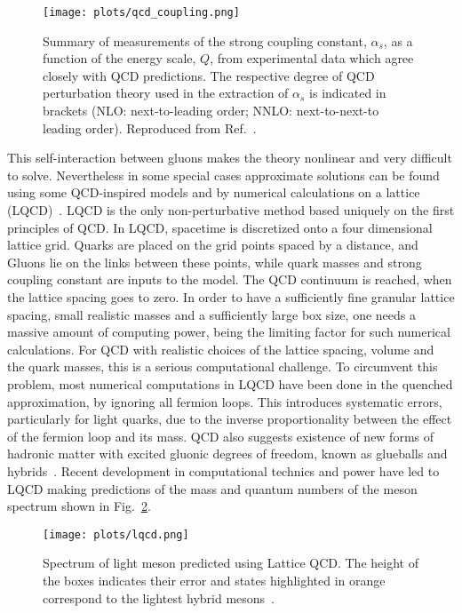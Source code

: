 \begin{figure}[!t]
    \centering
        \texttt{[image: plots/qcd\_coupling.png]}
        \caption{Summary of measurements of the strong coupling constant, $\alpha_{s}$, as a function of the energy scale, $Q$, from experimental data which agree closely with QCD predictions. The respective degree of QCD perturbation theory used in the extraction of $\alpha_{s}$ is indicated in brackets (NLO: next-to-leading order; NNLO: next-to-next-to leading order). Reproduced from Ref.~\cite{Tanabashi18}.}
        \label{fig.1.1.2}
\end{figure}

This self-interaction between gluons makes the theory nonlinear and very difficult to solve. Nevertheless in some special cases approximate solutions can be found using some QCD-inspired models and by numerical calculations on a lattice (LQCD)~\cite{Dudek13}. LQCD is the only non-perturbative method based uniquely on the first principles of QCD. In LQCD, spacetime is discretized onto a four dimensional lattice grid. Quarks are placed on the grid points spaced by a distance, and Gluons lie on the links between these points, while quark masses and strong coupling constant are inputs to the model. The QCD continuum is reached, when the lattice spacing goes to zero. In order to have a sufficiently fine granular lattice spacing, small realistic masses and a sufficiently large box size, one needs a massive amount of computing power, being the limiting factor for such numerical calculations. For QCD with realistic choices of the lattice spacing, volume and the quark masses, this is a serious computational challenge. To circumvent this problem, most numerical computations in LQCD have been done in the quenched approximation, by ignoring all fermion loops. This introduces systematic errors, particularly for light quarks, due to the inverse proportionality between the effect of the fermion loop and its mass. QCD also suggests existence of new forms of hadronic matter with excited gluonic degrees of freedom, known as glueballs and hybrids~\cite{Tanabashi18}. Recent development in computational technics and power have led to LQCD making predictions of the mass and quantum numbers of the meson spectrum shown in Fig.~\ref{fig.1.1.3}.

\begin{landscape}
    \vspace*{\fill}
    \begin{figure}[H]
        \centering
        \texttt{[image: plots/lqcd.png]}
        \caption{Spectrum of light meson predicted using Lattice QCD. The height of the boxes indicates their error and states highlighted in orange correspond to the lightest hybrid mesons~\cite{Dudek13}.}
        \label{fig.1.1.3}
    \end{figure}
    \vspace*{\fill}
\end{landscape}

